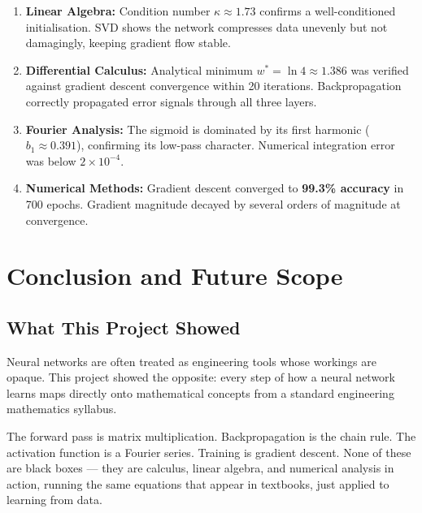 \documentclass[12pt,a4paper]{article}
\begin{document}
\begin{enumerate}[leftmargin=2em, itemsep=5pt]
  \item \textbf{Linear Algebra:} Condition number $\kappa \approx 1.73$ confirms a well-conditioned initialisation. SVD shows the network compresses data unevenly but not damagingly, keeping gradient flow stable.

  \item \textbf{Differential Calculus:} Analytical minimum $w^* = \ln 4 \approx 1.386$ was verified against gradient descent convergence within 20 iterations. Backpropagation correctly propagated error signals through all three layers.

  \item \textbf{Fourier Analysis:} The sigmoid is dominated by its first harmonic ($b_1 \approx 0.391$), confirming its low-pass character. Numerical integration error was below $2\times10^{-4}$.

  \item \textbf{Numerical Methods:} Gradient descent converged to \textbf{99.3\% accuracy} in 700 epochs. Gradient magnitude decayed by several orders of magnitude at convergence.
\end{enumerate}

\newpage

\section{Conclusion and Future Scope}

\subsection{What This Project Showed}

Neural networks are often treated as engineering tools whose workings are opaque. This project showed the opposite: every step of how a neural network learns maps directly onto mathematical concepts from a standard engineering mathematics syllabus.

The forward pass is matrix multiplication. Backpropagation is the chain rule. The activation function is a Fourier series. Training is gradient descent. None of these are black boxes --- they are calculus, linear algebra, and numerical analysis in action, running the same equations that appear in textbooks, just applied to learning from data.
\end{document}
